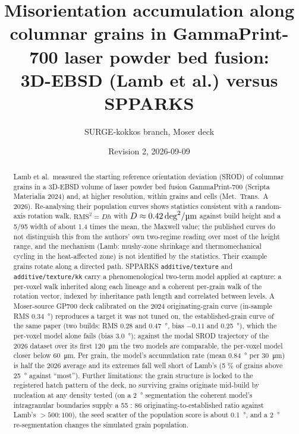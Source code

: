 \documentclass[11pt,a4paper]{article}
\title{Misorientation accumulation along columnar grains in GammaPrint-700 laser powder bed fusion:\\ 3D-EBSD (Lamb et al.) versus SPPARKS}
\author{SURGE-kokkos branch, \code{additive/texture/kk} Moser deck}
\date{Revision 2, 2026-09-09}
\newcommand{\code}[1]{\texttt{#1}}
\newcommand{\Dunit}{\si{deg\squared\per\micro\metre}}
\begin{document}
\maketitle

\begin{abstract}
Lamb et al.\ measured the starting reference orientation deviation (SROD) of columnar grains in a 3D-EBSD volume of laser powder bed fusion GammaPrint-700 (Scripta Materialia 2024) and, at higher resolution, within grains and cells (Met.\ Trans.\ A 2026). Re-analysing their population curves shows statistics consistent with a random-axis rotation walk, $\mathrm{RMS}^2 = D h$ with $D \approx \SI{0.42}{\Dunit}$ against build height and a 5/95 width of about 1.4 times the mean, the Maxwell value; the published curves do not distinguish this from the authors' own two-regime reading over most of the height range, and the mechanism (Lamb: mushy-zone shrinkage and thermomechanical cycling in the heat-affected zone) is not identified by the statistics. Their example grains rotate along a directed path. SPPARKS \code{additive/texture} and \code{additive/texture/kk} carry a phenomenological two-term model applied at capture: a per-voxel walk inherited along each lineage and a coherent per-grain walk of the rotation vector, indexed by inheritance path length and correlated between levels. A Moser-source GP700 deck calibrated on the 2024 originating-grain curve (in-sample RMS \SI{0.34}{\degree}) reproduces a target it was not tuned on, the established-grain curve of the same paper (two builds: RMS 0.28 and \SI{0.47}{\degree}, bias $-0.11$ and \SI{+0.25}{\degree}), which the per-voxel model alone fails (bias \SI{+3.0}{\degree}); against the modal SROD trajectory of the 2026 dataset over its first \SI{120}{\micro\metre} the two models are comparable, the per-voxel model closer below \SI{60}{\micro\metre}. Per grain, the model's accumulation rate (mean \SI{0.84}{\degree} per \SI{30}{\micro\metre}) is half the 2026 average and its extremes fall well short of Lamb's (5 \% of grains above \SI{25}{\degree} against ``most''). Further limitations: the grain structure is locked to the registered hatch pattern of the deck, no surviving grains originate mid-build by nucleation at any density tested (on a \SI{2}{\degree} segmentation the coherent model's intragranular boundaries supply a 55 : 86 originating-to-established ratio against Lamb's $> 500 : 100$), the seed scatter of the population score is about \SI{0.1}{\degree}, and a \SI{2}{\degree} re-segmentation changes the simulated grain population.
\end{abstract}
\end{document}
